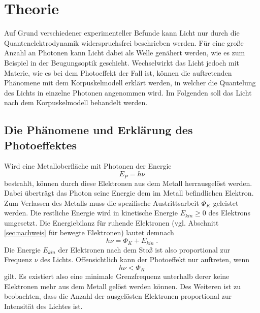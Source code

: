 \section{Theorie}
\label{sec:Theorie}
Auf Grund verschiedener experimenteller Befunde kann Licht nur durch die Quantenelektrodynamik widerspruchsfrei beschrieben werden.
Für eine große Anzahl an Photonen kann Licht dabei als Welle genähert werden, wie es zum Beispiel in der Beugungsoptik geschieht.
Wechselwirkt das Licht jedoch mit Materie, wie es bei dem Photoeffekt der Fall ist, können die auftretenden Phänomene mit dem
Korpuskelmodell erklärt werden, in welcher die Quantelung des Lichts in einzelne Photonen angenommen wird. Im Folgenden soll
das Licht nach dem Korpuskelmodell behandelt werden.

\subsection{Die Phänomene und Erklärung des Photoeffektes}
\label{sec:phänomene}
Wird eine Metalloberfläche mit Photonen der Energie
\begin{equation}
    E_{P}=h\nu
    \label{eqn:photon}
\end{equation}
bestrahlt, können durch diese Elektronen aus dem Metall herrausgelöst werden. Dabei überträgt das Photon seine Energie dem im Metall
befindlichen Elektron. Zum Verlassen des Metalls muss die spezifische
Austrittsarbeit $\Phi_K$ geleistet werden. Die restliche Energie wird in kinetische Energie $E_{kin}\geq 0$ des Elektrons umgesetzt. Die
Energiebilanz für ruhende Elektronen (vgl. Abschnitt \ref{sec:nachweis} für bewegte Elektronen) lautet demnach
\begin{equation}
    h\nu=\Phi_K+E_{kin}\;.
    \label{eqn:bilanz}
\end{equation}
Die Energie $E_{kin}$ der Elektronen nach dem Stoß ist also proportional zur Frequenz $\nu$ des Lichts.
Offensichtlich kann der Photoeffekt nur auftreten, wenn
\begin{equation*}
    h\nu<\Phi_K
\end{equation*}
gilt. Es existiert also eine minimale Grenzfrequenz unterhalb derer keine Elektronen mehr aus dem Metall gelöst werden können.
Des Weiteren ist zu beobachten, dass die Anzahl der ausgelösten Elektronen proportional zur Intensität des Lichtes ist.

